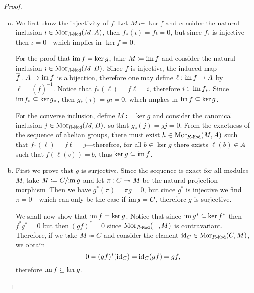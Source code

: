 \begin{proof}
    \begin{enumerate}[(a)]\setlength\itemsep{0em}
        \item We first show the injectivity of \(f\). Let \(M \coloneq \ker f\) and
              consider the natural inclusion \(\iota \in \operatorname{Mor}_{{R\text{-}\texttt{Mod}}}(M, A)\), then
              \(f_{*}(\iota) = f \iota = 0\), but since \(f_{*}\) is injective then
              \(\iota = 0\)---which implies in \(\ker f = 0\).

              For the proof that \(\operatorname{im} f = \ker g\), take \(M \coloneq \operatorname{im} f\) and consider
              the natural inclusion \(i \in \operatorname{Mor}_{{R\text{-}\texttt{Mod}}}(M, B)\). Since \(f\) is
              injective, the induced map \(\overline{f}: A \to \operatorname{im} f\) is a bijection,
              therefore one may define \(\ell: \operatorname{im} f \to A\) by
              \(\ell = (\overline{f})^{-1}\). Notice that \(f_{*}(\ell) = f \ell = i\),
              therefore \(i \in \operatorname{im} f_{*}\). Since \(\operatorname{im} f_{*} \subseteq \ker g_{*}\), then
              \(g_{*}(i) = g i = 0\), which implies in \(\operatorname{im} f \subseteq \ker g\).

              For the converse inclusion, define \(M \coloneq \ker g\) and consider the
              canonical inclusion \(j \in \operatorname{Mor}_{{R\text{-}\texttt{Mod}}}(M, B)\), so that
              \(g_{*}(j) = g j = 0\). From the exactness of the sequence of abelian groups,
              there must exist \(h \in \operatorname{Mor}_{{R\text{-}\texttt{Mod}}}(M, A)\) such that
              \(f_{*}(\ell) = f \ell = j\)---therefore, for all \(b \in \ker g\) there
              exists \(\ell(b) \in A\) such that \(f(\ell(b)) = b\), thus
              \(\ker g \subseteq \operatorname{im} f\).

        \item First we prove that \(g\) is surjective. Since the sequence is exact for
              all modules \(M\), take \(M \coloneq C/{\operatorname{im} g}\) and let \(\pi: C \twoheadrightarrow M\) be
              the natural projection morphism. Then we have \(g^{*}(\pi) = \pi g = 0\), but
              since \(g^{*}\) is injective we find \(\pi = 0\)---which can only be the case
              if \(\operatorname{im} g = C\), therefore \(g\) is surjective.

              We shall now show that \(\operatorname{im} f = \ker g\). Notice that since \(\operatorname{im} g^{*}
              \subseteq \ker f^{*}\) then \(f^{*} g^{*} = 0\) but then \((g f)^{*} = 0\)
              since \(\operatorname{Mor}_{{R\text{-}\texttt{Mod}}}(-, M)\) is contravariant. Therefore, if we take \(M
              \coloneq C\) and consider the element \(\operatorname{id}_C \in \operatorname{Mor}_{{R\text{-}\texttt{Mod}}}(C, M)\), we
              obtain
              \[
                  0 = (g f)^{*}(\operatorname{id}_C) = \operatorname{id}_C (g f) = g f,
              \]
              therefore \(\operatorname{im} f \subseteq \ker g\).


\end{enumerate}
\end{proof}
